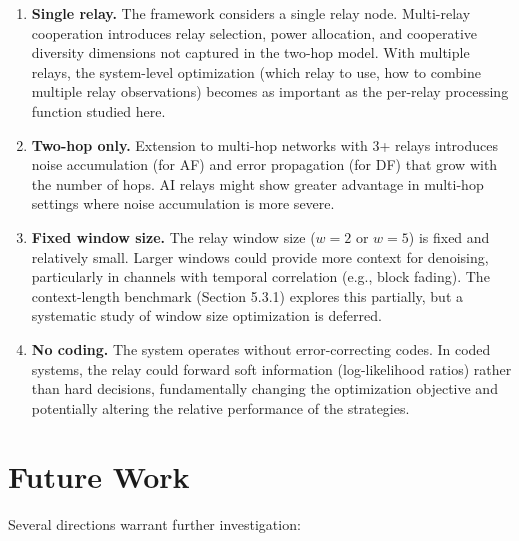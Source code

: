 \documentclass[
  english,
  12pt,
  12pt,
  a4paper,
  oneside]{report}
\begin{document}
\begin{enumerate}
\item
  \textbf{Single relay.} The framework considers a single relay node. Multi-relay cooperation introduces relay selection, power allocation, and cooperative diversity dimensions not captured in the two-hop model. With multiple relays, the system-level optimization (which relay to use, how to combine multiple relay observations) becomes as important as the per-relay processing function studied here.
\item
  \textbf{Two-hop only.} Extension to multi-hop networks with 3+ relays introduces noise accumulation (for AF) and error propagation (for DF) that grow with the number of hops. AI relays might show greater advantage in multi-hop settings where noise accumulation is more severe.
\item
  \textbf{Fixed window size.} The relay window size (\(w = 2\) or \(w = 5\)) is fixed and relatively small. Larger windows could provide more context for denoising, particularly in channels with temporal correlation (e.g., block fading). The context-length benchmark (Section 5.3.1) explores this partially, but a systematic study of window size optimization is deferred.
\item
  \textbf{No coding.} The system operates without error-correcting codes. In coded systems, the relay could forward soft information (log-likelihood ratios) rather than hard decisions, fundamentally changing the optimization objective and potentially altering the relative performance of the strategies.
\end{enumerate}

\section{Future Work}\label{sec:future-work}

Several directions warrant further investigation:
\end{document}
